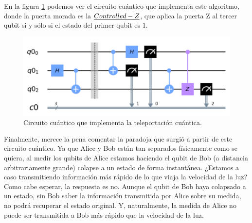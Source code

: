 \documentclass[11pt]{article}
\theoremstyle{plain}
\begin{document}
En la figura \ref{fig-teleportation} podemos ver el circuito cuántico que implementa este algoritmo, donde la puerta morada es la $\emph{Controlled-Z}$, que aplica la puerta Z al tercer qubit si y sólo si el estado del primer qubit es $1$.

\begin{figure}[H]
	\centering
	\includegraphics[scale=0.7]{figures/teleportation-circuit.pdf}
	\caption{Circuito cuántico que implementa la teleportación cuántica.}
	\label{fig-teleportation}
\end{figure}

Finalmente, merece la pena comentar la paradoja que surgió a partir de este circuito cuántico. Ya que Alice y Bob están tan separados físicamente como se quiera, al medir los qubits de Alice estamos haciendo el qubit de Bob (a distancia arbitrariamente grande) colapse a un estado de forma instantánea. ¿Estamos a caso transmitiendo información más rápido de lo que viaja la velocidad de la luz? \\

Como cabe esperar, la respuesta es no. Aunque el qubit de Bob haya colapsado a un estado, sin Bob saber la información transmitida por Alice sobre su medida, no podrá recuperar el estado original. Y, naturalmente, la medida de Alice no puede ser transmitida a Bob más rápido que la velocidad de la luz.
\end{document}
